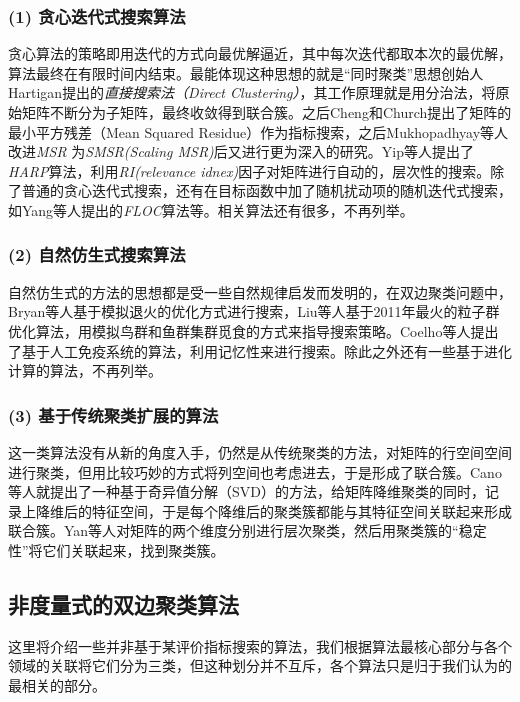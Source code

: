 \subsubsection*{(1) 贪心迭代式搜索算法}
贪心算法的策略即用迭代的方式向最优解逼近，其中每次迭代都取本次的最优解，算法最终在有限时间内结束。最能体现这种思想的就是“同时聚类”思想创始人Hartigan\cite{hartigan1972direct}提出的\emph{直接搜索法（Direct Clustering）}，其工作原理就是用分治法，将原始矩阵不断分为子矩阵，最终收敛得到联合簇。之后Cheng和Church\cite{cheng2000biclustering}提出了矩阵的最小平方残差（Mean Squared Residue）作为指标搜索，之后Mukhopadhyay等人\cite{mukhopadhyay2009novel}改进\emph{MSR} 为\emph{SMSR(Scaling MSR)}后又进行更为深入的研究。Yip等人\cite{yip2004harp}提出了\emph{HARP}算法，利用\emph{RI(relevance idnex)}因子对矩阵进行自动的，层次性的搜索。除了普通的贪心迭代式搜索，还有在目标函数中加了随机扰动项的随机迭代式搜索，如Yang等人\cite{yang2005improved}提出的\emph{FLOC}算法等。相关算法还有很多，不再列举。

\subsubsection*{(2) 自然仿生式搜索算法}
自然仿生式的方法的思想都是受一些自然规律启发而发明的，在双边聚类问题中，Bryan等人\cite{bryan2006application}基于模拟退火\cite{das2005quantum}的优化方式进行搜索，Liu等人\cite{liu2009biclustering}基于2011年最火的粒子群优化算法\cite{kennedy2011particle}，用模拟鸟群和鱼群集群觅食的方式来指导搜索策略。Coelho等人\cite{coelho2009multi}提出了基于人工免疫系统\cite{de2002artificial}的算法，利用记忆性来进行搜索。除此之外还有一些基于进化计算的算法，不再列举。

\subsubsection*{(3) 基于传统聚类扩展的算法}
这一类算法没有从新的角度入手，仍然是从传统聚类的方法，对矩阵的行空间空间进行聚类，但用比较巧妙的方式将列空间也考虑进去，于是形成了联合簇。Cano等人\cite{cano2007possibilistic}就提出了一种基于奇异值分解（SVD）的方法，给矩阵降维聚类的同时，记录上降维后的特征空间，于是每个降维后的聚类簇都能与其特征空间关联起来形成联合簇。Yan等人\cite{yang2011finding}对矩阵的两个维度分别进行层次聚类，然后用聚类簇的“稳定性”将它们关联起来，找到聚类簇。

\subsection{非度量式的双边聚类算法}
\label{nonsearch}
这里将介绍一些并非基于某评价指标搜索的算法，我们根据算法最核心部分与各个领域的关联将它们分为三类，但这种划分并不互斥，各个算法只是归于我们认为的最相关的部分。

